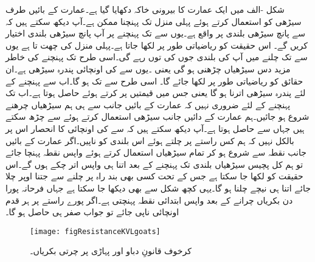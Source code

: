 شکل -الف میں ایک عمارت کا بیرونی خاکہ دکھایا گیا ہے۔عمارت کے بائیں طرف سیڑھی کو استعمال کرتے ہوئے پہلی منزل  تک پہنچنا ممکن ہے۔آپ دیکھ سکتے ہیں کہ  سے پانچ سیڑھی بلندی پر  واقع ہے۔یوں  سے   تک پہنچنے پر  آپ پانچ سیڑھی بلندی اختیار کریں گے۔ اس حقیقت کو ریاضیاتی طور پر  لکھا جاتا ہے۔پہلی منزل کی چھت  تا  ہے یوں  سے  تک چلنے میں آپ کی بلندی جوں کی توں رہے گی۔اسی طرح  تک پہنچنے کی خاطر مزید دس سیڑھیاں چڑھنی ہو گی یعنی ۔یوں  سے  کی اونچائی پندرہ سیڑھی ہے۔ان حقائق کو ریاضیاتی طور پر  لکھا جائے گا۔ اسی طرح  سے  تک  ہو گا۔اب  سے  پہنچنے کے لئے پندرہ سیڑھی اترنا ہو گا یعنی  جس میں قیمتیں پر کرتے ہوئے  حاصل ہوتا ہے۔اب  تک  پہنچنے کے لئے ضروری نہیں کہ عمارت کے بائیں جانب سے ہی ہم سیڑھیاں چرھنے شروع ہو جائیں۔ہم عمارت کے دائیں جانب سیڑھی استعمال کرتے ہوئے  سے  چڑھ سکتے ہیں جہاں سے  حاصل ہوتا ہے۔آپ دیکھ سکتے ہیں کہ  سے  کی اونچائی کا انحصار اس پر بالکل نہیں کہ ہم کس راستے پر چلتے ہوئے اس بلندی کو ناپیں۔اگر عمارت کے بائیں جانب نقطہ  سے شروع ہو کر تمام سیڑھیاں استعمال کرتے ہوئے واپس  نقطہ  پہنچا جائے تو ہم کل پچیس سیڑھیاں بلندی تک پہنچنے کے بعد اتنا ہی واپس اتر چکے ہوں گے۔اس حقیقت کو  لکھا جا سکتا ہے جس کے تحت کسی بھی بند راہ پر چلنے سے جتنا اوپر چلا جائے اتنا ہی نیچے چلنا ہو گا۔یہی کچھ شکل  سے بھی دیکھا جا سکتا ہے جہاں فرحانہ پورا دن بکریاں چرانے کے بعد واپس ابتدائی نقطہ  پہنچتی ہے۔اگر پورے راستے پر ہر قدم اونچائی ناپی جائے تو جواب صفر ہی حاصل ہو گا۔ 

\begin{figure}
\centering
\texttt{[image: figResistanceKVLgoats]}
\caption{کرخوف قانونِ دباو اور پہاڑی پر چرتی بکریاں۔}
\label{شکل_مزاحمتی_قانون_دباو_بکریاں}
\end{figure}
 
